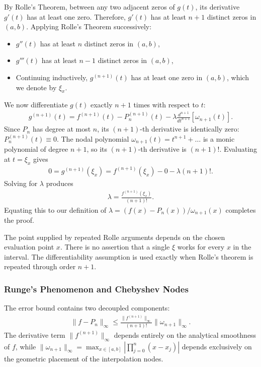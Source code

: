 \documentclass[../main.tex]{subfiles}
\begin{document}
{By Rolle's Theorem, between any two adjacent zeros of $g(t)$, its derivative $g'(t)$ has at least one zero. Therefore, $g'(t)$ has at least $n+1$ distinct zeros in $(a, b)$. Applying Rolle's Theorem successively:
\begin{itemize}
    \item $g''(t)$ has at least $n$ distinct zeros in $(a, b)$,
    \item $g'''(t)$ has at least $n-1$ distinct zeros in $(a, b)$,
    \item Continuing inductively, $g^{(n+1)}(t)$ has at least one zero in $(a, b)$, which we denote by $\xi_x$.
\end{itemize}
We now differentiate $g(t)$ exactly $n+1$ times with respect to $t$:
\begin{align*}
    g^{(n+1)}(t) = f^{(n+1)}(t) - P_n^{(n+1)}(t) - \lambda \frac{d^{n+1}}{dt^{n+1}} [\omega_{n+1}(t)].
\end{align*}
Since $P_n$ has degree at most $n$, its $(n+1)$-th derivative is identically zero: $P_n^{(n+1)}(t) \equiv 0$. The nodal polynomial $\omega_{n+1}(t) = t^{n+1} + \dots$ is a monic polynomial of degree $n+1$, so its $(n+1)$-th derivative is $(n+1)!$. Evaluating at $t = \xi_x$ gives
\begin{align*}
    0 = g^{(n+1)}(\xi_x) = f^{(n+1)}(\xi_x) - 0 - \lambda (n+1)!.
\end{align*}
Solving for $\lambda$ produces
\begin{align*}
    \lambda = \frac{f^{(n+1)}(\xi_x)}{(n+1)!}.
\end{align*}
Equating this to our definition of $\lambda = (f(x) - P_n(x)) / \omega_{n+1}(x)$ completes the proof.


The point supplied by repeated Rolle arguments depends on the chosen evaluation point $x$. There is no assertion that a single $\xi$ works for every $x$ in the interval. The differentiability assumption is used exactly when Rolle's theorem is repeated through order $n+1$.
}

\subsubsection{Runge's Phenomenon and Chebyshev Nodes}

The error bound contains two decoupled components:
\begin{align*}
    \|f - P_n\|_\infty \leq \frac{\|f^{(n+1)}\|_\infty}{(n+1)!} \|\omega_{n+1}\|_\infty.
\end{align*}
The derivative term $\|f^{(n+1)}\|_\infty$ depends entirely on the analytical smoothness of $f$, while $\|\omega_{n+1}\|_\infty = \max_{x \in [a, b]} |\prod_{j=0}^n (x - x_j)|$ depends exclusively on the geometric placement of the interpolation nodes.
\end{document}
